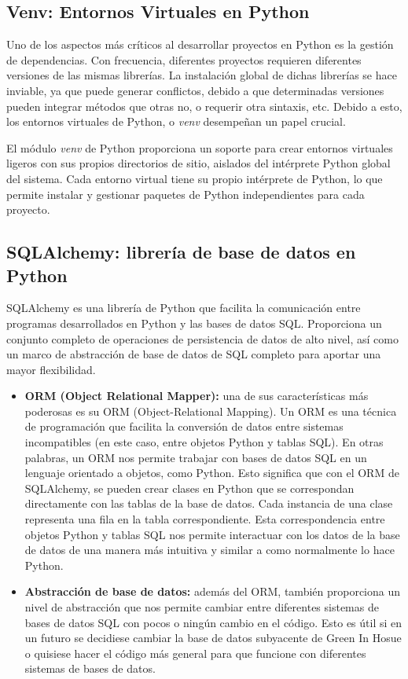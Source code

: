     \subsection{Venv: Entornos Virtuales en Python}
    Uno de los aspectos más críticos al desarrollar proyectos en Python es la gestión de dependencias. Con frecuencia, diferentes proyectos requieren diferentes versiones de las mismas librerías. La instalación global de dichas librerías se hace inviable, ya que puede generar conflictos, debido a que determinadas versiones pueden integrar métodos que otras no, o requerir otra sintaxis, etc. Debido a esto, los entornos virtuales de Python, o \textit{venv} desempeñan un papel crucial. \cite{wiki:venv}
    
    El módulo \textit{venv} de Python proporciona un soporte para crear entornos virtuales ligeros con sus propios directorios de sitio, aislados del intérprete Python global del sistema. Cada entorno virtual tiene su propio intérprete de Python, lo que permite instalar y gestionar paquetes de Python independientes para cada proyecto.

    \subsection{SQLAlchemy: librería de base de datos en Python}
    SQLAlchemy \cite{wiki:sqlalchemy} es una librería de Python que facilita la comunicación entre programas desarrollados en Python y las bases de datos SQL. Proporciona un conjunto completo de operaciones de persistencia de datos de alto nivel, así como un marco de abstracción de base de datos de SQL completo para aportar una mayor flexibilidad. 
    \begin{itemize}
        \item \textbf{ORM (Object Relational Mapper):} una de sus características más poderosas es su ORM (Object-Relational Mapping). Un ORM es una técnica de programación que facilita la conversión de datos entre sistemas incompatibles (en este caso, entre objetos Python y tablas SQL). En otras palabras, un ORM nos permite trabajar con bases de datos SQL en un lenguaje orientado a objetos, como Python. Esto significa que con el ORM de SQLAlchemy, se pueden crear clases en Python que se correspondan directamente con las tablas de la base de datos. Cada instancia de una clase representa una fila en la tabla correspondiente. Esta correspondencia entre objetos Python y tablas SQL nos permite interactuar con los datos de la base de datos de una manera más intuitiva y similar a como normalmente lo hace Python.
        \item \textbf{Abstracción de base de datos:} además del ORM, también proporciona un nivel de abstracción que nos permite cambiar entre diferentes sistemas de bases de datos SQL con pocos o ningún cambio en el código. Esto es útil si en un futuro se decidiese cambiar la base de datos subyacente de Green In Hosue o quisiese hacer el código más general para que funcione con diferentes sistemas de bases de datos.
    \end{itemize}

